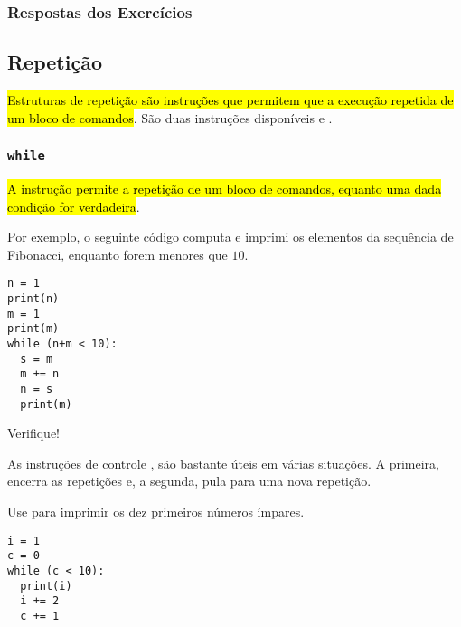\ifisbook 
\subsubsection*{Respostas dos Exercícios}
\shipoutAnswer
\fi

\subsection{Repetição}

\hl{Estruturas de repetição são instruções que permitem que a execução repetida de um bloco de comandos}. São duas instruções disponíveis {\PYTHONwhile} e {\PYTHONfor}.

\subsubsection{\texttt{while}}

\hl{A instrução {\PYTHONwhile} permite a repetição de um bloco de comandos, equanto uma dada condição for verdadeira}. 

Por exemplo, o seguinte código computa e imprimi os elementos da sequência de Fibonacci{\fibonacci}, enquanto forem menores que $10$.

\begin{lstlisting}
n = 1
print(n)
m = 1
print(m)
while (n+m < 10):
  s = m
  m += n
  n = s
  print(m)
\end{lstlisting}

Verifique!

\begin{obs}
  As instruções de controle {\PYTHONbreak}, {\PYTHONcontinue} são bastante úteis em várias situações. A primeira, encerra as repetições e, a segunda, pula para uma nova repetição.
\end{obs}

\begin{exer}
  Use {\PYTHONwhile} para imprimir os dez primeiros números ímpares.
\end{exer}
\begin{resp}
  
\begin{lstlisting}
i = 1
c = 0
while (c < 10):
  print(i)
  i += 2
  c += 1
\end{lstlisting}

\end{resp}


